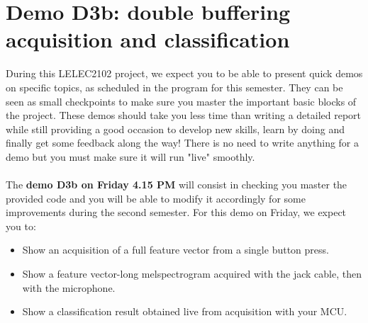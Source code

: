 \section{Demo D3b: double buffering acquisition and classification}
%
During this LELEC2102 project, we expect you to be able to present quick demos on specific topics, as scheduled in the program for this semester. They can be seen as small checkpoints to make sure you master the important basic blocks of the project. These demos should take you less time than writing a detailed report while still providing a good occasion to develop new skills, learn by doing and finally get some feedback along the way! There is no need to write anything for a demo but you must make sure it will run "live" smoothly. \\
\\
The \textbf{demo D3b on Friday 4.15 PM} will consist in checking you master the provided code and you will be able to modify it accordingly for some improvements during the second semester. For this demo on Friday, we expect you to:
%
\begin{itemize}
    \item Show an acquisition of a full feature vector from a single button press.
    \item Show a feature vector-long melspectrogram acquired with the jack cable, then with the microphone.
    \item Show a classification result obtained live from acquisition with your MCU.
\end{itemize}
